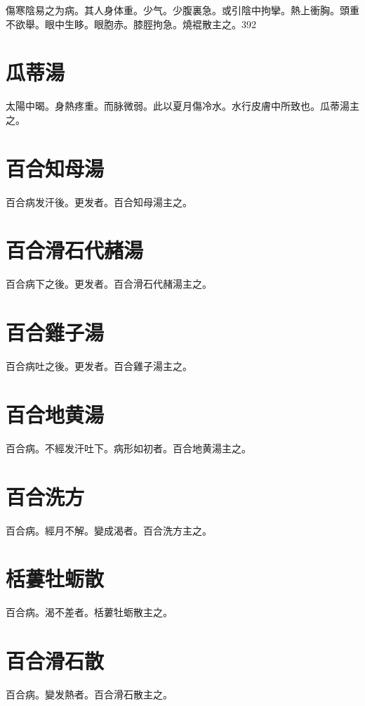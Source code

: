 \documentclass[b5paper,twoside,zihao=-4,UTF8]{ctexbook}
\begin{document}
傷寒陰易之为病。其人身体重。少气。少腹裏急。或引陰中拘攣。熱上衝胸。頭重不欲舉。眼中生眵。{眼胞赤。}膝脛拘急。燒裩散主之。392

\section{瓜蒂湯}

太陽中暍。身熱疼重。而脉微弱。此以夏月傷冷水。水行皮膚中所致也。瓜蒂湯主之。

\section{百合知母湯}

百合病发汗後。更发者。百合知母湯主之。

\section{百合滑石代赭湯}

百合病下之後。更发者。百合滑石代赭湯主之。

\section{百合雞子湯}

百合病吐之後。更发者。百合雞子湯主之。

\section{百合地黄湯}

百合病。不經发汗吐下。病形如初者。百合地黄湯主之。

\section{百合洗方}

百合病。經月不解。變成渴者。百合洗方主之。

\section{栝蔞牡蛎散}

百合病。渴不差者。栝蔞牡蛎散主之。

\section{百合滑石散}

百合病。變发熱者。百合滑石散主之。
\end{document}
